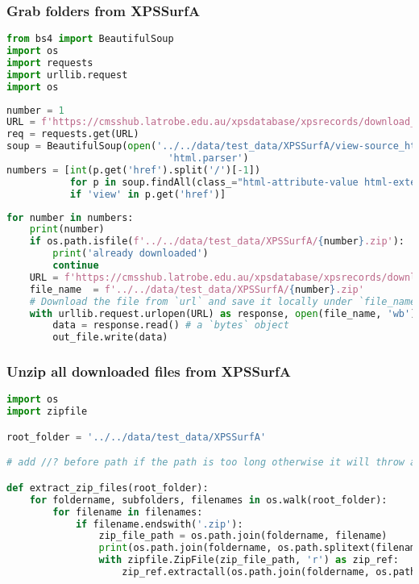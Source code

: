 \subsubsection*{Grab folders from XPSSurfA}\label{grab-folders-from-xpssurfa}

\begin{lstlisting}[language=Python]
from bs4 import BeautifulSoup
import os
import requests
import urllib.request
import os
\end{lstlisting}

\begin{lstlisting}[language=Python]
number = 1
URL = f'https://cmsshub.latrobe.edu.au/xpsdatabase/xpsrecords/download_data_files/{number}'
req = requests.get(URL)
soup = BeautifulSoup(open('../../data/test_data/XPSSurfA/view-source_https___cmsshub.latrobe.edu.au_xpsdatabase_xpsrecords.html'),
                            'html.parser')
numbers = [int(p.get('href').split('/')[-1]) 
           for p in soup.findAll(class_="html-attribute-value html-external-link") 
           if 'view' in p.get('href')]
\end{lstlisting}

\begin{lstlisting}[language=Python]
for number in numbers:
    print(number)
    if os.path.isfile(f'../../data/test_data/XPSSurfA/{number}.zip'):
        print('already downloaded')
        continue
    URL = f'https://cmsshub.latrobe.edu.au/xpsdatabase/xpsrecords/download_data_files/{number}'
    file_name  = f'../../data/test_data/XPSSurfA/{number}.zip'
    # Download the file from `url` and save it locally under `file_name`:
    with urllib.request.urlopen(URL) as response, open(file_name, 'wb') as out_file:
        data = response.read() # a `bytes` object
        out_file.write(data)
\end{lstlisting}

\subsubsection*{Unzip all downloaded files from
XPSSurfA}\label{unzip-all-downloaded-files-from-xpslibrary.com}

\begin{lstlisting}[language=Python]
import os
import zipfile

root_folder = '../../data/test_data/XPSSurfA'

# add //? before path if the path is too long otherwise it will throw an error

def extract_zip_files(root_folder):
    for foldername, subfolders, filenames in os.walk(root_folder):
        for filename in filenames:
            if filename.endswith('.zip'):
                zip_file_path = os.path.join(foldername, filename)
                print(os.path.join(foldername, os.path.splitext(filename)[0]))
                with zipfile.ZipFile(zip_file_path, 'r') as zip_ref:
                    zip_ref.extractall(os.path.join(foldername, os.path.splitext(filename)[0]))
\end{lstlisting}

